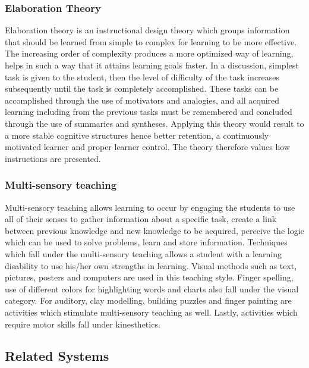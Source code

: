 \documentclass[letterpaper, 12pt, oneside]{book}
\begin{document}
\subsubsection{Elaboration Theory}
Elaboration theory is an instructional design theory which groups information that should be learned from simple to complex for learning to be more effective. The increasing order of complexity produces a more optimized way of learning, helps in such a way that it attains learning goals faster. In a discussion, simplest task is given to the student, then the level of difficulty of the task increases subsequently until the task is completely accomplished. These tasks can be accomplished through the use of motivators and analogies, and all acquired learning including from the previous tasks must be remembered and concluded through the use of summaries and syntheses. Applying this theory would result to a more stable cognitive structures hence better retention, a continuously motivated learner and proper learner control. The theory therefore values how instructions are presented. 

\subsubsection{Multi-sensory teaching}
Multi-sensory teaching allows learning to occur by engaging the students to use all of their senses to gather information about a specific task, create a link between previous knowledge and new knowledge to be acquired, perceive the logic which can be used to solve problems, learn and store information. Techniques which fall under the multi-sensory teaching allows a student with a learning disability to use his/her own strengths in learning. Visual methods such as text, pictures, posters and computers are used in this teaching style. Finger spelling, use of different colors for highlighting words and charts also fall under the visual category. For auditory, clay modelling, building puzzles and finger painting are activities which stimulate multi-sensory teaching as well. Lastly, activities which require motor skills fall under kinesthetics. 

\subsection{Related Systems}
\end{document}
